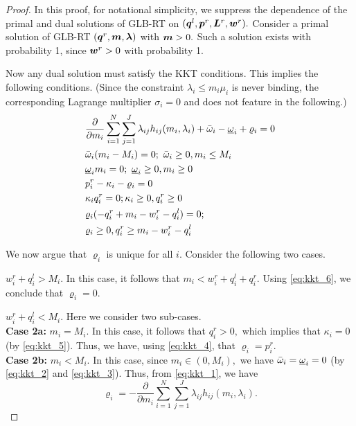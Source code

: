 \begin{proof}
  In this proof, for notational simplicity, we suppress the dependence
  of the primal and dual solutions of GLB-RT on
  $(\boldsymbol{q}^l,\boldsymbol{p}^r,\boldsymbol{L}^r,\boldsymbol{w}^r).$ Consider a
  primal solution of GLB-RT
  $(\boldsymbol{q}^r,\boldsymbol{m},\boldsymbol{\lambda})$ with $\boldsymbol{m} > 0.$
  Such a solution exists with probability 1, since $\boldsymbol{w}^r > 0$
  with probability 1.

  Now any dual solution must satisfy the KKT conditions. This implies
  the following conditions. (Since the constraint $\lambda_i \leq m_i
  \mu_i$ is never binding, the corresponding Lagrange multiplier
  $\sigma_i = 0$ and does not feature in the following.)
\begin{align}
  \label{eq:kkt_1}
  & \frac{\partial}{\partial m_i} \sum_{i=1}^{N}\sum_{j=1}^{J} \lambda_{ij} h_{ij}(m_i,\lambda_i) + \bar{\omega}_i - \underbar{$\omega$}_i + \varrho_i = 0\\%
  \label{eq:kkt_2}
  &\bar{\omega}_i(m_i - M_i) = 0;\  \bar{\omega}_i \geq 0, m_i \leq M_i \\
  \label{eq:kkt_3}
  &\underbar{$\omega$}_i m_i = 0; \ \underbar{$\omega$}_i \geq 0, m_i \geq 0 \\
  \label{eq:kkt_4}
  &p_i^r - \kappa_i - \varrho_i= 0 \\
  \label{eq:kkt_5}
  &\kappa_i q^r_i = 0; \kappa_i \geq 0, q^r_i \geq 0 \\
  \label{eq:kkt_6}
  &\varrho_i(-q^r_i + m_i - w^r_i - q^l_i)  = 0; \\
  \label{eq:kkt_7}
  &\varrho_i \geq 0, q^r_i \geq m_i - w^r_i - q^l_i
\end{align}

We now argue that $\varrho_i$ is unique for all $i.$ Consider the
following two cases.

 $w^r_i + q^l_i > M_i.$ In this case, it
follows that $m_i <w^r_i + q^l_i + q^r_i.$ Using \eqref{eq:kkt_6}, we
conclude that $\varrho_i = 0.$

 $w^r_i + q^l_i < M_i.$ Here we consider two
sub-cases. \\
{\bf Case 2a:} $m_i = M_i.$ In this case, it follows that $q^r_i > 0,$
which implies that $\kappa_i = 0$ (by \eqref{eq:kkt_5}). Thus, we
have, using \eqref{eq:kkt_4}, that $\varrho_i = p^r_i.$\\
{\bf Case 2b:} $m_i < M_i.$ In this case, since $m_i \in (0,M_i),$ we
have $\bar{\omega}_i = \underbar{$\omega$}_i = 0$ 
(by \eqref{eq:kkt_2}
and \eqref{eq:kkt_3}). Thus, from \eqref{eq:kkt_1}, we
have 
\begin{equation}
\label{eq:der_closed_form}
\varrho_i = -\frac{\partial}{\partial m_i} \sum_{i=1}^{N}\sum_{j=1}^{J} \lambda_{ij} h_{ij}(m_i,\lambda_i). %
\end{equation}


\end{proof}
